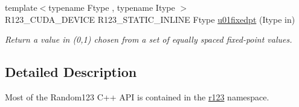 \begin{DoxyCompactItemize}
{\footnotesize template$<$typename Ftype , typename Itype $>$ }\\R123\+\_\+\+C\+U\+D\+A\+\_\+\+D\+E\+V\+I\+CE R123\+\_\+\+S\+T\+A\+T\+I\+C\+\_\+\+I\+N\+L\+I\+NE Ftype \hyperlink{group__uniform_ga6d75b90f162a67226c8044c6f3198b96}{u01fixedpt} (Itype in)
\begin{DoxyCompactList}\small\item\em Return a value in (0,1) chosen from a set of equally spaced fixed-\/point values. \end{DoxyCompactList}\end{DoxyCompactItemize}


\subsection{Detailed Description}
Most of the Random123 C++ A\+PI is contained in the \hyperlink{namespacer123}{r123} namespace. 